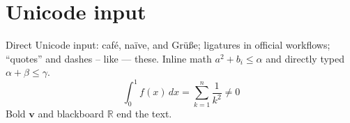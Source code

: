\documentclass[11pt]{article}
\begin{document}
\section{Unicode input}

Direct Unicode input: café, naïve, and Grüße; ligatures in official
workflows; ``quotes'' and dashes -- like --- these.
Inline math $a^2 + b_i \leq \alpha$ and directly typed $α + β ≤ γ$.
\begin{equation}
  \int_0^1 f(x)\,dx = \sum_{k=1}^{n} \frac{1}{k^2} \neq 0
\end{equation}
Bold $\mathbf{v}$ and blackboard $\mathbb{R}$ end the text.
\end{document}
